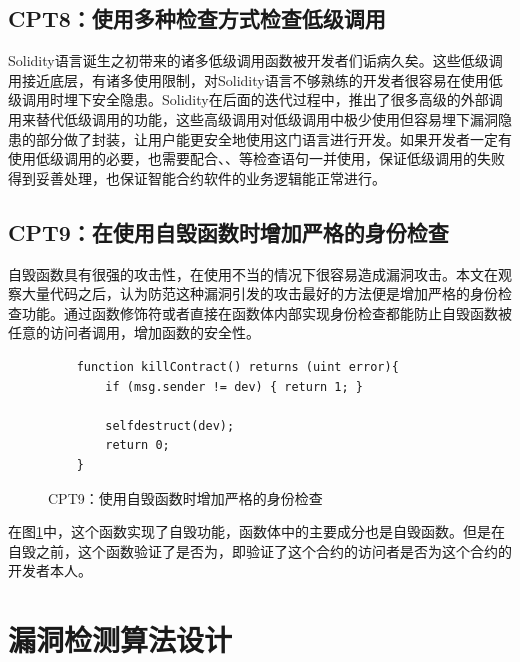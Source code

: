 \subsection{CPT8：使用多种检查方式检查低级调用}\label{sec:ss8}

Solidity语言诞生之初带来的诸多低级调用函数被开发者们诟病久矣。这些低级调用接近底层，有诸多使用限制，对Solidity语言不够熟练的开发者很容易在使用低级调用时埋下安全隐患。Solidity在后面的迭代过程中，推出了很多高级的外部调用来替代低级调用的功能，这些高级调用对低级调用中极少使用但容易埋下漏洞隐患的部分做了封装，让用户能更安全地使用这门语言进行开发。如果开发者一定有使用低级调用的必要，也需要配合、、等检查语句一并使用，保证低级调用的失败得到妥善处理，也保证智能合约软件的业务逻辑能正常进行。

\subsection{CPT9：在使用自毁函数时增加严格的身份检查}\label{sec:ss9}

自毁函数具有很强的攻击性，在使用不当的情况下很容易造成漏洞攻击。本文在观察大量代码之后，认为防范这种漏洞引发的攻击最好的方法便是增加严格的身份检查功能。通过函数修饰符或者直接在函数体内部实现身份检查都能防止自毁函数被任意的访问者调用，增加函数的安全性。
\begin{figure}
\begin{minipage}[htbp]{1.0\linewidth}
    \begin{lstlisting}
    function killContract() returns (uint error){
        if (msg.sender != dev) { return 1; }

        selfdestruct(dev);
        return 0;
    }
    \end{lstlisting}
\end{minipage}
\vspace{-5mm}
\caption{CPT9：使用自毁函数时增加严格的身份检查}
\label{fig:ss9_example}
\end{figure}
在图\ref{fig:ss9_example}中，这个函数实现了自毁功能，函数体中的主要成分也是自毁函数。但是在自毁之前，这个函数验证了是否为，即验证了这个合约的访问者是否为这个合约的开发者本人。

\section{漏洞检测算法设计}

